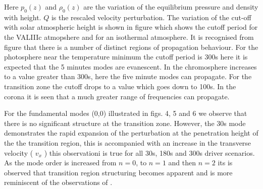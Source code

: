 \documentclass[authoryear,final,1p]{elsarticle}
\begin{document}
Here $p_0(z)$ and $\rho_0(z)$ are the variation of the equilibrium pressure and density with height. $Q$ is the rescaled velocity perturbation. The variation of the cut-off with solar atmospheric height is shown in figure  which shows the cutoff period for the VALIIIc atmopshere and for an isothermal atmosphere. It is recognised from figure  that there is a number of distinct regions of propagation behaviour. For the photosphere near the temperature minimum  the cutoff period is 300s here it is expected that the 5 minutes modes are evanescent. In the chromosphere increases to a value greater than 300s, here the five minute modes can propagate. For the transition zone the cutoff drops to a value which goes down to 100s. In the corona it is seen that a much greater range of frequencies can propagate.

For the fundamental modes (0,0)  illustrated in figs. 4, 5 and 6 we observe that there is no significant structure at the transition zone. However, the 30s mode demonstrates the rapid expansion of the perturbation at the penetration height of the the transition region, this is accompanied with an increase in the transverse velocity ( $v_x$ ) this observationi is true for all 30s, 180s and 300s driver scenarios. As the mode order is increased from $n=0$, to $n=1$ and then $n=2$ its is observed that transition region structuring becomes apparent and is more reminiscent of the observations of \citet{Malins2007B}.
\end{document}
